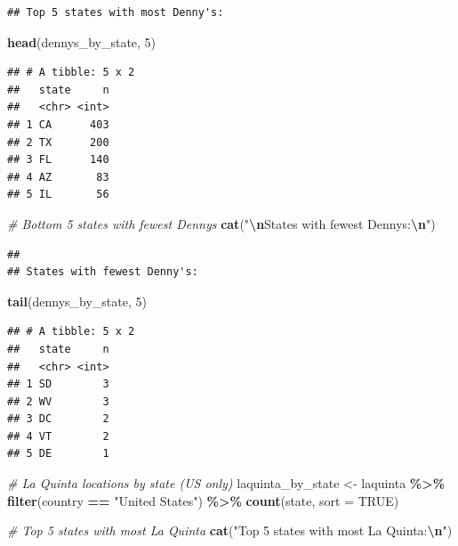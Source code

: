 \documentclass[
]{article}
\newenvironment{Shaded}{\begin{snugshade}}{\end{snugshade}}
\newcommand{\AttributeTok}[1]{\textcolor[rgb]{0.13,0.29,0.53}{#1}}
\newcommand{\CommentTok}[1]{\textcolor[rgb]{0.56,0.35,0.01}{\textit{#1}}}
\newcommand{\ConstantTok}[1]{\textcolor[rgb]{0.56,0.35,0.01}{#1}}
\newcommand{\DecValTok}[1]{\textcolor[rgb]{0.00,0.00,0.81}{#1}}
\newcommand{\FunctionTok}[1]{\textcolor[rgb]{0.13,0.29,0.53}{\textbf{#1}}}
\newcommand{\NormalTok}[1]{#1}
\newcommand{\OtherTok}[1]{\textcolor[rgb]{0.56,0.35,0.01}{#1}}
\newcommand{\SpecialCharTok}[1]{\textcolor[rgb]{0.81,0.36,0.00}{\textbf{#1}}}
\newcommand{\StringTok}[1]{\textcolor[rgb]{0.31,0.60,0.02}{#1}}
\begin{document}
\begin{verbatim}
## Top 5 states with most Denny's:
\end{verbatim}

\begin{Shaded}
\begin{Highlighting}[]
\FunctionTok{head}\NormalTok{(dennys\_by\_state, }\DecValTok{5}\NormalTok{)}
\end{Highlighting}
\end{Shaded}

\begin{verbatim}
## # A tibble: 5 x 2
##   state     n
##   <chr> <int>
## 1 CA      403
## 2 TX      200
## 3 FL      140
## 4 AZ       83
## 5 IL       56
\end{verbatim}

\begin{Shaded}
\begin{Highlighting}[]
\CommentTok{\# Bottom 5 states with fewest Denny\textquotesingle{}s}
\FunctionTok{cat}\NormalTok{(}\StringTok{"}\SpecialCharTok{\textbackslash{}n}\StringTok{States with fewest Denny\textquotesingle{}s:}\SpecialCharTok{\textbackslash{}n}\StringTok{"}\NormalTok{)}
\end{Highlighting}
\end{Shaded}

\begin{verbatim}
## 
## States with fewest Denny's:
\end{verbatim}

\begin{Shaded}
\begin{Highlighting}[]
\FunctionTok{tail}\NormalTok{(dennys\_by\_state, }\DecValTok{5}\NormalTok{)}
\end{Highlighting}
\end{Shaded}

\begin{verbatim}
## # A tibble: 5 x 2
##   state     n
##   <chr> <int>
## 1 SD        3
## 2 WV        3
## 3 DC        2
## 4 VT        2
## 5 DE        1
\end{verbatim}

\begin{Shaded}
\begin{Highlighting}[]
\CommentTok{\# La Quinta locations by state (US only)}
\NormalTok{laquinta\_by\_state }\OtherTok{\textless{}{-}}\NormalTok{ laquinta }\SpecialCharTok{\%\textgreater{}\%}
  \FunctionTok{filter}\NormalTok{(country }\SpecialCharTok{==} \StringTok{"United States"}\NormalTok{) }\SpecialCharTok{\%\textgreater{}\%}
  \FunctionTok{count}\NormalTok{(state, }\AttributeTok{sort =} \ConstantTok{TRUE}\NormalTok{)}

\CommentTok{\# Top 5 states with most La Quinta}
\FunctionTok{cat}\NormalTok{(}\StringTok{"Top 5 states with most La Quinta:}\SpecialCharTok{\textbackslash{}n}\StringTok{"}\NormalTok{)}
\end{Highlighting}
\end{Shaded}
\end{document}
